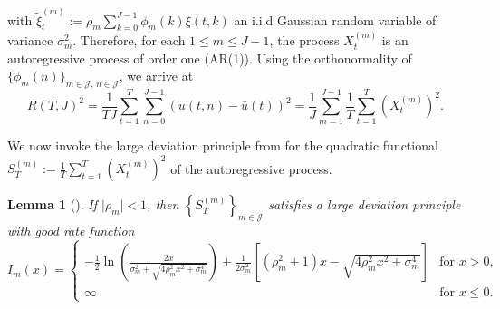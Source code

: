 \documentclass[12pt]{amsart}
\newtheorem{lemma}{Lemma}[section]
\numberwithin{equation}{section}
\newcommand{\1}{\mathbf{1}}
\begin{document}
with $\tilde{\xi}_t^{(m)}:=\rho_m\sum\limits_{k=0}^{J-1}\phi_m(k)\xi(t,k)$ an i.i.d Gaussian random variable of variance $\sigma_m^2$. Therefore, for each $1\le m\le J-1$, the process $X_t^{(m)}$ is an autoregressive process of order one (AR(1)). Using the orthonormality of $\{\phi_m(n)\}_{m\in\mathcal{J},\,n\in\mathcal{J}}$, we arrive at
\begin{equation}
\label{st}
    R(T,J)^2=\frac{1}{TJ}\sum_{t=1}^T\sum_{n=0}^{J-1}(u(t,n)-\bar{u}(t))^2 = \frac{1}{J}\sum_{m=1}^{J-1}\frac{1}{T}\sum_{t=1}^T\left(X_t^{(m)}\right)^2.
\end{equation}

We now invoke the large deviation principle from \cite{bryc1993large} for the quadratic functional $S_T^{(m)}:=\frac{1}{T}\sum\limits_{t=1}^T\left(X_t^{(m)}\right)^2$ of the autoregressive process.
\begin{lemma}[\cite{bryc1993large}]
\label{ldp}
    If $\vert\rho_m\vert<1$, then $\left\lbrace S^{(m)}_T\right\rbrace_{m\in\mathcal{J}}$ satisfies a large deviation principle with good rate function
    \begin{equation*}
        I_m(x)=\begin{cases}
           -\frac{1}{2}\ln\left(\frac{2x}{\sigma_m^2+\sqrt{4\rho_m^2x^2+\sigma_m^4}}\right)+\frac{1}{2\sigma_m^2}\left[(\rho_m^2+1)x-\sqrt{4\rho_m^2x^2+\sigma_m^4}\right]&\text{for } x>0,\\
            \infty&\text{for } x\leq 0.
        \end{cases}
    \end{equation*}
\end{lemma}
\end{document}
